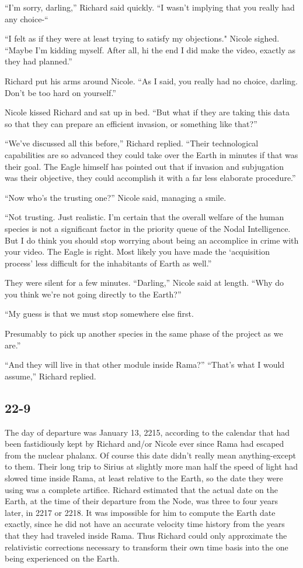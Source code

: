 \documentclass[]{article}
\begin{document}
{“I’m sorry, darling,” Richard said quickly.  “I wasn’t implying that you really had any choice-“

“I felt as if they were at least trying to satisfy my objections."  Nicole sighed.  “Maybe I’m kidding myself.  After all, hi the end I did make the video, exactly as they had planned.”

Richard put his arms around Nicole.  “As I said, you really had no choice, darling.  Don’t be too hard on yourself.”

Nicole kissed Richard and sat up in bed.  “But what if they are taking this data so that they can prepare an efficient invasion, or something like that?”

“We’ve discussed all this before,” Richard replied.  “Their technological capabilities are so advanced they could take over the Earth in minutes if that was their goal.  The Eagle himself has pointed out that if invasion and subjugation was their objective, they could accomplish it with a far less elaborate procedure.”

“Now who’s the trusting one?” Nicole said, managing a smile.

“Not trusting.  Just realistic.  I’m certain that the overall welfare of the human species is not a significant factor in the priority queue of the Nodal Intelligence.  But I do think you should stop worrying about being an accomplice in crime with your video.  The Eagle is right.  Most likely you have made the ‘acquisition process’ less difficult for the inhabitants of Earth as well.”

They were silent for a few minutes.  “Darling,” Nicole said at length.  “Why do you think we’re not going directly to the Earth?”

“My guess is that we must stop somewhere else first.

Presumably to pick up another species in the same phase of the project as we are.”

“And they will live in that other module inside Rama?” “That’s what I would assume,” Richard replied.

\subsection*{22-9}

The day of departure was January 13, 2215, according to the calendar that had been fastidiously kept by Richard and/or Nicole ever since Rama had escaped from the nuclear phalanx.  Of course this date didn’t really mean anything-except to them.  Their long trip to Sirius at slightly more man half the speed of light had slowed time inside Rama, at least relative to the Earth, so the date they were using was a complete artifice.  Richard estimated that the actual date on the Earth, at the time of their departure from the Node, was three to four years later, in 2217 or 2218.  It was impossible for him to compute the Earth date exactly, since he did not have an accurate velocity time history from the years that they had traveled inside Rama.  Thus Richard could only approximate the relativistic corrections necessary to transform their own time basis into the one being experienced on the Earth.

}
\end{document}
